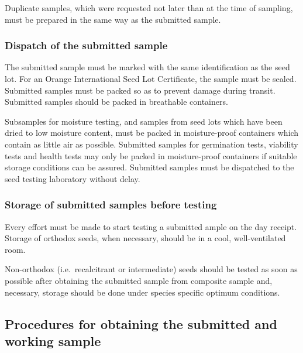 \documentclass[
]{book}
\begin{document}
Duplicate samples, which were requested not later than at the time of sampling, must be prepared in the same way as the submitted sample.

\hypertarget{dispatch-of-the-submitted-sample}{%
\subsubsection{Dispatch of the submitted sample}\label{dispatch-of-the-submitted-sample}}

The submitted sample must be marked with the same identification as the seed lot. For an Orange International Seed Lot Certificate, the sample must be sealed. Submitted samples must be packed so as to prevent damage during transit. Submitted samples should be packed in breathable containers.

Subsamples for moisture testing, and samples from seed lots which have been dried to low moisture content, must be packed in moisture-proof containers which contain as little air as possible. Submitted samples for germination tests, viability tests and health tests may only be packed in moisture-proof containers if suitable storage conditions can be assured. Submitted samples must be dispatched to the seed testing laboratory without delay.

\hypertarget{storage-of-submitted-samples-before-testing}{%
\subsubsection{Storage of submitted samples before testing}\label{storage-of-submitted-samples-before-testing}}

Every effort must be made to start testing a submitted ample on the day receipt. Storage of orthodox seeds, when necessary, should be in a cool, well-ventilated room.

Non-orthodox (i.e.~recalcitrant or intermediate) seeds should be tested as soon as possible after obtaining the submitted sample from composite sample and, necessary, storage should be done under species specific optimum conditions.

\hypertarget{procedures-for-obtaining-the-submitted-and-working-sample}{%
\subsection{Procedures for obtaining the submitted and working sample}\label{procedures-for-obtaining-the-submitted-and-working-sample}}
\end{document}
